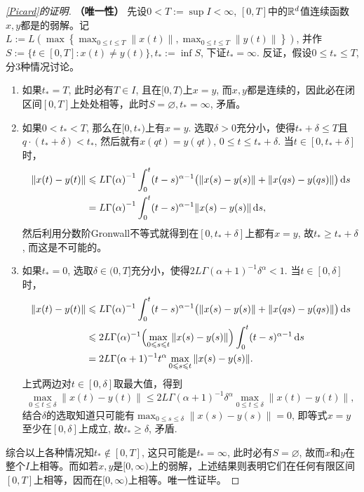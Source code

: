 \begin{proof}[\cref{Picard}的证明]
    \textbf{（唯一性）} 先设$0<T:=\sup I<\infty$, $[0,T]$中的$\mathbb{R}^d$值连续函数$x,y$都是\mainEquation 的弱解。记$L:=L\left(\max\left\{\max_{0\leqslant t\leqslant T}\|x(t)\|,\right.\right.\allowbreak\left.\left.\max_{0\leqslant t\leqslant T}\|y(t)\|\right\}\right)$, 并作$S:=\{t\in [0,T]\colon x(t)\neq y(t)\},t_*:=\inf S$, 下证$t_*=\infty$. 反证，假设$0\leqslant t_*\leqslant T$, 分3种情况讨论。
    \begin{enumerate}
        \item 如果$t_*=T$, 此时必有$T\in I$, 且在$[0,T)$上$x=y$, 而$x,y$都是连续的，因此必在闭区间$[0,T]$上处处相等，此时$S=\varnothing,t_*=\infty$, 矛盾。
        \item 如果$0<t_*<T$, 那么在$[0,t_*)$上有$x=y$. 选取$\delta>0$充分小，使得$t_*+\delta\leqslant T$且$q\cdot (t_*+\delta)<t_*$, 然后就有$x(qt)=y(qt),\,0\leqslant t\leqslant t_*+\delta$. 当$t\in \left[0,t_*+\delta\right]$时，
        \begin{align*}
            \left\| x(t) - y(t) \right\| &\leqslant {L}{\Gamma(\alpha)}^{-1} \int_0^t (t-s)^{\alpha-1} \bigl(\|x(s)-y(s)\|+\|x(qs)-y(qs)\|\bigr) \mathop{}\!\mathrm{d} s\\
            &={L}{\Gamma(\alpha)}^{-1} \int_0^t (t-s)^{\alpha-1} \|x(s)-y(s)\| \mathop{}\!\mathrm{d} s,
        \end{align*}
        然后利用分数阶Gronwall不等式\cite{mild}就得到在$\left[0,t_*+\delta\right]$上都有$x=y$, 故$t_*\geqslant t_*+\delta$, 而这是不可能的。
        \item 如果$t_*=0$, 选取$\delta\in (0,T]$充分小，使得$2L\Gamma(\alpha+1)^{-1}\delta^\alpha<1$. 当$t\in[0,\delta]$时，
        \begin{align*}
            \left\| x(t) - y(t) \right\| &\leqslant L\Gamma(\alpha)^{-1}\int_0^t (t-s)^{\alpha-1} \bigl(\|x(s)-y(s)\|+\|x(qs)-y(qs)\|\bigr) \mathop{}\!\mathrm{d} s\\
            &\leqslant 2L\Gamma(\alpha)^{-1} \Bigl(\max_{0\leqslant s\leqslant t}\|x(s)-y(s)\|\Bigr) \int_0^t (t-s)^{\alpha-1} \mathop{}\!\mathrm{d} s\\
            &=2L\Gamma(\alpha+1)^{-1}t^\alpha \max_{0\leqslant s\leqslant t}\|x(s)-y(s)\|.
        \end{align*}
        上式两边对$t\in[0,\delta]$取最大值，得到
        \begin{equation*}
            \max_{0\leqslant t\leqslant \delta}\|x(t)-y(t)\|\leqslant 2L\Gamma(\alpha+1)^{-1}\delta^\alpha \max_{0\leqslant t\leqslant \delta}\|x(t)-y(t)\|,
        \end{equation*}
        结合$\delta$的选取知道只可能有$\max_{0\leqslant s\leqslant \delta}\|x(s)-y(s)\|=0$, 即等式$x=y$至少在$[0,\delta]$上成立, 故$t_*\geqslant \delta$, 矛盾.
    \end{enumerate}
    综合以上各种情况知$t_*\notin [0,T]$, 这只可能是$t_*=\infty$, 此时必有$S=\varnothing$, 故而$x$和$y$在整个$I$上相等。而如若$x,y$是$[0,\infty)$上\mainEquation 的弱解，上述结果则表明它们在任何有限区间$[0,T]$上相等，因而在$[0,\infty)$上相等。唯一性证毕。
\end{proof}

